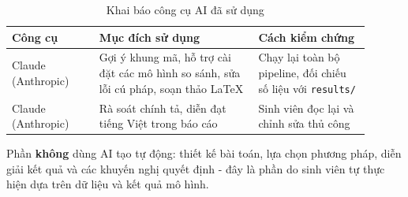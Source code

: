 \documentclass[12pt, a4paper]{report}
\begin{document}
\begin{table}[H]
\centering
\caption{Khai báo công cụ AI đã sử dụng}
\label{tab:ai}
\renewcommand{\arraystretch}{1.3}
\begin{tabular}{|>{\raggedright\arraybackslash}p{0.22\linewidth}|>{\raggedright\arraybackslash}p{0.40\linewidth}|>{\raggedright\arraybackslash}p{0.28\linewidth}|}
\hline
\rowcolor{gray!18}
\textbf{Công cụ} & \textbf{Mục đích sử dụng} & \textbf{Cách kiểm chứng} \\
\hline
Claude (Anthropic) & Gợi ý khung mã, hỗ trợ cài đặt các mô hình so sánh, sửa lỗi cú pháp, soạn thảo \LaTeX & Chạy lại toàn bộ pipeline, đối chiếu số liệu với \texttt{results/} \\
\hline
Claude (Anthropic) & Rà soát chính tả, diễn đạt tiếng Việt trong báo cáo & Sinh viên đọc lại và chỉnh sửa thủ công \\
\hline
\end{tabular}
\end{table}

Phần \textbf{không} dùng AI tạo tự động: thiết kế bài toán, lựa chọn phương pháp, diễn giải kết quả và các khuyến nghị quyết định - đây là phần do sinh viên tự thực hiện dựa trên dữ liệu và kết quả mô hình.
\end{document}
